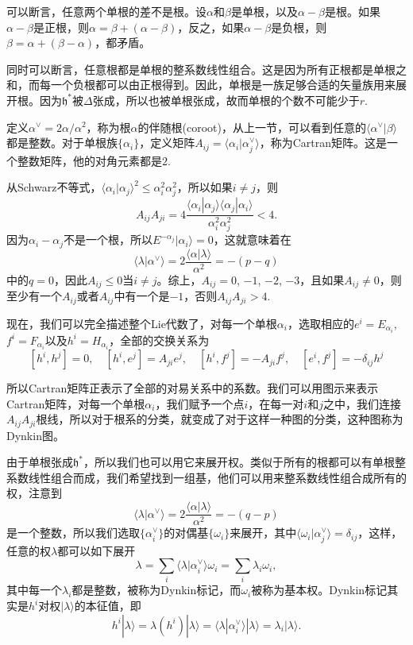 \documentclass[9pt]{extarticle}
\begin{document}
\para 可以断言，任意两个单根的差不是根。设$\alpha$和$\beta$是单根，以及$\alpha-\beta$是根。如果$\alpha-\beta$是正根，则$\alpha=\beta+(\alpha-\beta)$，反之，如果$\alpha-\beta$是负根，则$\beta=\alpha+(\beta-\alpha)$，都矛盾。

同时可以断言，任意根都是单根的整系数线性组合。这是因为所有正根都是单根之和，而每一个负根都可以由正根得到。因此，单根是一族足够合适的矢量族用来展开根。因为$\mathfrak{h}^*$被$\Delta$张成，所以也被单根张成，故而单根的个数不可能少于$r$. 

\para 定义$\alpha^\vee=2\alpha/\alpha^2$，称为根$\alpha$的伴随根(coroot)，从上一节，可以看到任意的$\langle \alpha^\vee|\beta\rangle$都是整数。对于单根族$\{\alpha_i\}$，定义矩阵$A_{ij}=\langle \alpha_i|\alpha^\vee_j\rangle$，称为Cartran矩阵。这是一个整数矩阵，他的对角元素都是$2$.

从Schwarz不等式，$\langle \alpha_i|\alpha_j\rangle^2\leq \alpha_i^2\alpha_j^2$，所以如果$i\neq j$，则
\[
	A_{ij}A_{ji}=4\frac{\langle \alpha_i|\alpha_j\rangle\langle \alpha_j|\alpha_i\rangle}{\alpha_i^2\alpha_j^2}<4.
\]
因为$\alpha_i-\alpha_j$不是一个根，所以$E^{-\alpha_j}|\alpha_i\rangle =0$，这就意味着在
\[
	\langle \lambda|\alpha^\vee\rangle =2\frac{\langle\alpha|\lambda\rangle}{\alpha^2}=-(p-q)
\]
中的$q=0$，因此$A_{ij}\leq 0$当$i\neq j$。综上，$A_{ij}=0$, $-1$, $-2$, $-3$，且如果$A_{ij}\neq 0$，则至少有一个$A_{ij}$或者$A_{ij}$中有一个是$-1$，否则$A_{ij}A_{ji}>4$.


\para 现在，我们可以完全描述整个Lie代数了，对每一个单根$\alpha_i$，选取相应的$e^i=E_{\alpha_i}$, $f^{i}=F_{\alpha_i}$以及$h^i=H_{\alpha_i}$，全部的交换关系为
\[
	[h^i,h^j]=0,\quad [h^i,e^j]=A_{ji}e^j,\quad [h^i,f^j]=-A_{ji}f^j,\quad [e^i,f^j]=-\delta_{ij}h^j
\]

所以Cartran矩阵正表示了全部的对易关系中的系数。我们可以用图示来表示Cartran矩阵，对每一个单根$\alpha_i$，我们赋予一个点$i$，在每一对$i$和$j$之中，我们连接$A_{ij}A_{ji}$根线，所以对于根系的分类，就变成了对于这样一种图的分类，这种图称为Dynkin图。

\para 由于单根张成$\mathfrak{h}^*$，所以我们也可以用它来展开权。类似于所有的根都可以有单根整系数线性组合而成，我们希望找到一组基，他们可以用来整系数线性组合成所有的权，注意到
\[
	\langle\lambda|\alpha^\vee\rangle=2\frac{\langle\alpha|\lambda\rangle}{\alpha^2}=-(q-p)
\]
是一个整数，所以我们选取$\{\alpha_i^\vee\}$的对偶基$\{\omega_i\}$来展开，其中$\langle \omega_i|\alpha_j^\vee\rangle=\delta_{ij}$，这样，任意的权$\lambda$都可以如下展开
\[
	\lambda=\sum_i \langle \lambda|\alpha_i^\vee\rangle \omega_i=\sum_i \lambda_i \omega_i,
\]
其中每一个$\lambda_i$都是整数，被称为Dynkin标记，而$\omega_i$被称为基本权。Dynkin标记其实是$h^i$对权$|\lambda \rangle$的本征值，即
\[
	h^i|\lambda \rangle=\lambda(h^i)|\lambda \rangle=\langle\lambda|\alpha_i^\vee\rangle|\lambda \rangle=\lambda_i|\lambda \rangle.
\]
\end{document}
